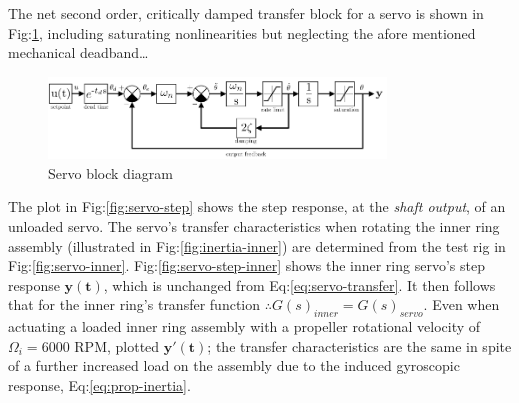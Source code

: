 \par
The net second order, critically damped transfer block for a servo is shown in Fig:\ref{fig:servo-block}, including saturating nonlinearities but neglecting the afore mentioned mechanical deadband\ldots
\begin{figure}[hbtp]
\centering
\includegraphics[width=0.8\textwidth]{figs/servo-block}
\vspace{-5pt}
\caption{Servo block diagram}
\label{fig:servo-block}
\vspace{-15pt}
\end{figure}
\par
The plot in Fig:\ref{fig:servo-step} shows the step response, at the \emph{shaft output}, of an unloaded servo. The servo's transfer characteristics when rotating the inner ring assembly (illustrated in Fig:\ref{fig:inertia-inner}) are determined from the test rig in Fig:\ref{fig:servo-inner}. Fig:\ref{fig:servo-step-inner} shows the inner ring servo's step response {\color{Blue}$\mathbf{y(t)}$}, which is unchanged from Eq:\ref{eq:servo-transfer}. It then follows that for the inner ring's transfer function $\therefore G(s)_{inner}=G(s)_{servo}$. Even when actuating a loaded inner ring assembly with a propeller rotational velocity of $\Omega_i=6000$ RPM, plotted {\color{Red}$\mathbf{y'(t)}$}; the transfer characteristics are the same in spite of a further increased load on the assembly due to the induced gyroscopic response, Eq:\ref{eq:prop-inertia}.
